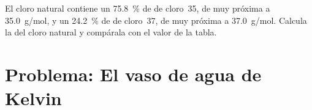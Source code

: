\begin{exercise}[$\star\star\star$]\label{exo:g10:the-mole:15}
El cloro natural contiene un \qty{75.8}{\percent} de  de cloro~35,
de  muy próxima a \qty{35.0}{g/mol}, y un \qty{24.2}{\percent}
de  de cloro~37, de  muy próxima a \qty{37.0}{g/mol}.
Calcula la  del cloro natural y compárala con el valor
de la tabla.
\end{exercise}

\section{Problema: El vaso de agua de Kelvin}

